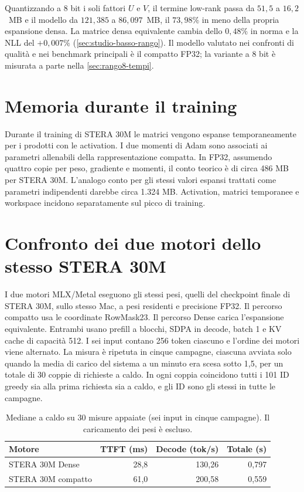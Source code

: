 Quantizzando a 8 bit i soli fattori $U$ e $V$, il termine low-rank passa da $51{,}5$ a $16{,}2$~MB e il modello da $121{,}385$ a $86{,}097$~MB, il $73{,}98\%$ in meno della propria espansione densa. La matrice densa equivalente cambia dello $0{,}48\%$ in norma e la NLL del $+0{,}007\%$ (\autoref{sec:studio-basso-rango}). Il modello valutato nei confronti di qualità e nei benchmark principali è il compatto FP32; la variante a 8 bit è misurata a parte nella \autoref{sec:rango8-tempi}.

\section{Memoria durante il training}

Durante il training di STERA 30M le matrici vengono espanse temporaneamente per i prodotti con le activation. I due momenti di Adam sono associati ai parametri allenabili della rappresentazione compatta. In FP32, assumendo quattro copie per peso, gradiente e momenti, il conto teorico è di circa 486 MB per STERA 30M. L'analogo conto per gli stessi valori espansi trattati come parametri indipendenti darebbe circa 1.324 MB. Activation, matrici temporanee e workspace incidono separatamente sul picco di training.

\section{Confronto dei due motori dello stesso STERA 30M}
\label{sec:replica-stera-dense}

I due motori MLX/Metal eseguono gli stessi pesi, quelli del checkpoint finale di STERA 30M, sullo stesso Mac, a pesi residenti e precisione FP32. Il percorso compatto usa le coordinate RowMask23. Il percorso Dense carica l'espansione equivalente. Entrambi usano prefill a blocchi, SDPA in decode, batch 1 e KV cache di capacità 512. I sei input contano 256 token ciascuno e l'ordine dei motori viene alternato. La misura è ripetuta in cinque campagne, ciascuna avviata solo quando la media di carico del sistema a un minuto era scesa sotto 1,5, per un totale di 30 coppie di richieste a caldo. In ogni coppia coincidono tutti i 101 ID greedy sia alla prima richiesta sia a caldo, e gli ID sono gli stessi in tutte le campagne.

\begin{table}[htbp]
\centering
\begin{tabular}{lrrr}
\toprule
Motore & TTFT (ms) & Decode (tok/s) & Totale (s) \\
\midrule
STERA 30M Dense & 28,8 & 130,26 & 0,797 \\
STERA 30M compatto & 61,0 & 200,58 & 0,559 \\
\bottomrule
\end{tabular}
\caption{Mediane a caldo su 30 misure appaiate (sei input in cinque campagne). Il caricamento dei pesi è escluso.}
\label{tab:replica-stera-dense}
\end{table}

